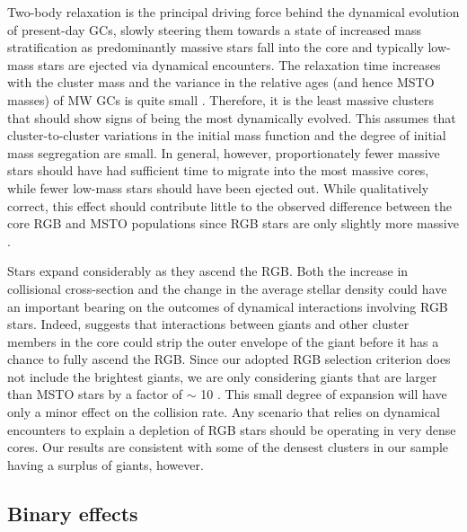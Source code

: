 Two-body relaxation is the principal driving force behind the dynamical
evolution of present-day GCs, slowly steering them towards a state of
increased mass stratification as predominantly  
massive stars fall into the core and typically low-mass stars are
ejected via dynamical encounters.  The relaxation time increases
with the cluster mass \citep{spitzer87} and the variance in the relative ages
(and hence MSTO masses) of MW GCs is quite small
\citep{deangeli05}.  Therefore, it is the
least massive clusters that should show signs of being the
most dynamically evolved.  This assumes that cluster-to-cluster
variations in the initial mass function and the degree of
initial mass segregation are small.  In general, however,
proportionately fewer massive stars should have had sufficient time to
migrate into the most massive cores, while 
fewer low-mass stars should have been ejected out.  While qualitatively
correct, this effect should contribute little to the observed
difference between the core RGB and MSTO populations since RGB stars
are only slightly more massive \citep[e.g.][]{demarchi07}.

Stars expand considerably as they ascend the RGB.  Both the increase
in collisional cross-section and the change 
in the average stellar density could have an important bearing on the
outcomes of dynamical interactions involving RGB stars.  Indeed,
\citet{bailyn94} suggests that interactions between giants and other
cluster members in the core could strip the outer envelope of the
giant before it has a chance to fully ascend the RGB.  Since our
adopted RGB selection criterion does not include the brightest giants, 
we are only considering giants that are larger than MSTO stars
by a factor of $\sim$ 10 \citep{iben91}.  This small degree of
expansion will have only a minor effect on the collision rate.  Any
scenario that relies on dynamical encounters to explain a depletion of
RGB stars should be operating in very dense cores.  Our results are
consistent with some of the densest clusters in our sample having a
surplus of giants, however.  

\subsection{Binary effects}

